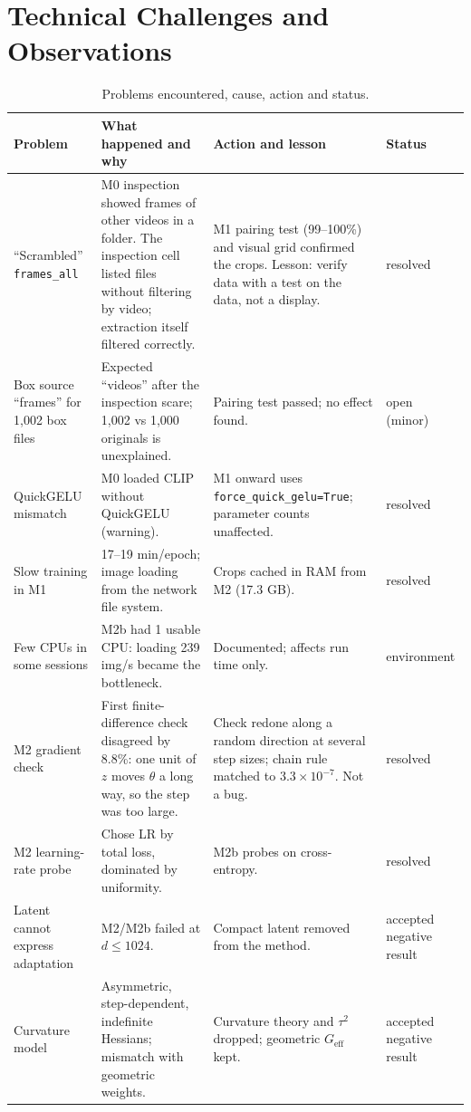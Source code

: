 \documentclass[10pt,a4paper]{article}
\begin{document}
\section{Technical Challenges and Observations}\label{sec:problems}
\begin{table}[H]\centering\scriptsize
\caption{Problems encountered, cause, action and status.}\label{tab:problems}
\begin{tabularx}{\linewidth}{@{}L{2.6cm}YYL{1.5cm}@{}}
\toprule
Problem & What happened and why & Action and lesson & Status\\
\midrule
``Scrambled'' \texttt{frames\_all} & M0 inspection showed frames of other videos in a folder. The inspection cell listed files without filtering by video; extraction itself filtered correctly. & M1 pairing test (99--100\%) and visual grid confirmed the crops. Lesson: verify data with a test on the data, not a display. & resolved\\
Box source ``frames'' for 1,002 box files & Expected ``videos'' after the inspection scare; 1,002 vs 1,000 originals is unexplained. & Pairing test passed; no effect found. & open (minor)\\
QuickGELU mismatch & M0 loaded CLIP without QuickGELU (warning). & M1 onward uses \texttt{force\_quick\_gelu=True}; parameter counts unaffected. & resolved\\
Slow training in M1 & 17--19 min/epoch; image loading from the network file system. & Crops cached in RAM from M2 (17.3 GB). & resolved\\
Few CPUs in some sessions & M2b had 1 usable CPU: loading 239 img/s became the bottleneck. & Documented; affects run time only. & environment\\
M2 gradient check & First finite-difference check disagreed by 8.8\%: one unit of \(z\) moves \(\theta\) a long way, so the step was too large. & Check redone along a random direction at several step sizes; chain rule matched to \(3.3\times10^{-7}\). Not a bug. & resolved\\
M2 learning-rate probe & Chose LR by total loss, dominated by uniformity. & M2b probes on cross-entropy. & resolved\\
Latent cannot express adaptation & M2/M2b failed at \(d\le1024\). & Compact latent removed from the method. & accepted negative result\\
Curvature model & Asymmetric, step-dependent, indefinite Hessians; mismatch with geometric weights. & Curvature theory and \(\tau^2\) dropped; geometric \(G_\text{eff}\) kept. & accepted negative result\\

\end{tabularx}
\end{table}
\end{document}
